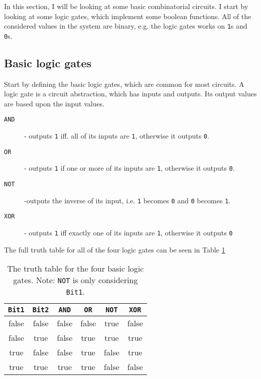 In this section, I will be looking at some basic combinatorial circuits. I
start by looking at some logic gates, which implement some boolean functions.
All of the considered values in the system are binary, e.g. the logic gates
works on \texttt{1}s and \texttt{0}s.

\subsection{Basic logic gates}
Start by defining the basic logic gates, which are common for most circuits. A
logic gate is a circuit abstraction, which has inputs and outputs. Its output
values are based upon the input values.

\begin{description}
    \item[\texttt{AND}] - outputs \texttt{1} iff. all of its inputs are
        \texttt{1}, otherwise it outputs \texttt{0}.

    \item[\texttt{OR}] - outputs \texttt{1} if one or more of its inputs are
        \texttt{1}, otherwise it outputs \texttt{0}.

    \item[\texttt{NOT}] -outputs the inverse of its input, i.e. \texttt{1}
        becomes \texttt{0} and \texttt{0} becomes \texttt{1}.

    \item[\texttt{XOR}] - outputs \texttt{1} iff exactly one of its inputs are
        \texttt{1}, otherwise it outputs \texttt{0}
\end{description}
The full truth table for all of the four logic gates can be seen in Table
\ref{tab:truth-table}

\begin{table}
    \centering
    \begin{tabular}{cc|cccc}
        \toprule
        \texttt{Bit1} & \texttt{Bit2} & \texttt{AND} & \texttt{OR} &
        \texttt{NOT} & \texttt{XOR} \\
        \midrule
        false     & false     & false    & false   & true     & false \\
        false     & true      & false    & true    & true     & true  \\
        true      & false     & false    & true    & false    & true  \\
        true      & true      & true     & true    & false    & false \\
        \bottomrule
    \end{tabular}
    \caption{The truth table for the four basic logic gates. Note: \texttt{NOT}
    is only considering \texttt{Bit1}.}
    \label{tab:truth-table}
\end{table}

